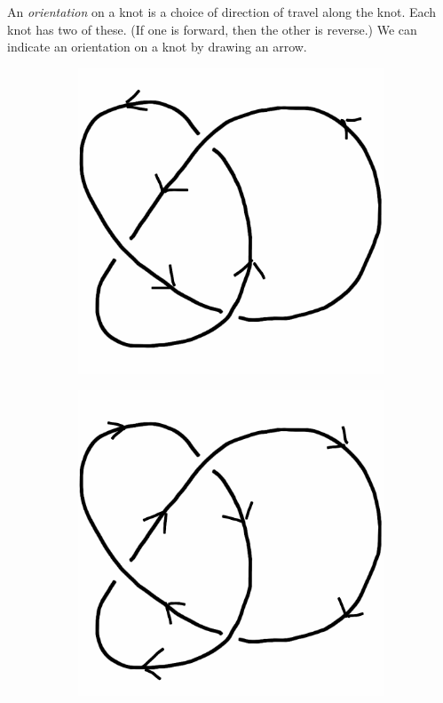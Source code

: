 \documentclass[12pt,letterpaper]{article}
\theoremstyle{definition}
\begin{document}
An \emph{orientation} on a knot is a choice of direction of travel along the knot.
Each knot has two of these. 
(If one is forward, then the other is reverse.)
We can indicate an orientation on a knot by drawing an arrow.

\begin{figure}[h]
    \centering
    \begin{subfigure}{.3\textwidth}
        \centering
        \includegraphics[width=\textwidth]{rgp11pics/trefoil-forward.png}
    \end{subfigure}
    \hspace{1cm}
    \begin{subfigure}{.3\textwidth}
        \centering         
        \includegraphics[width=\textwidth]{rgp11pics/trefoil-reverse.png}

\end{subfigure}
\end{figure}
\end{document}
